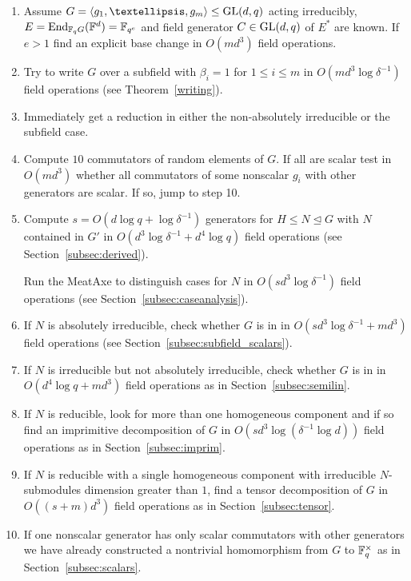 \begin{enumerate}
\item Assume $G = \left< g_1, \ldots, g_m \right> \le \GL(d,q)$ acting
irreducibly, $E = \End_{\F_q G}(\F^d) = \F_{q^e}$ and
field generator $C \in \GL(d,q)$ of $E^\ast$ are known. If $e > 1$ find an explicit
base change in $O(md^3)$ field operations.
\item Try to write $G$ over a subfield with $\beta_i = 1$ for $1 \leq i \leq m$ 
in $O(md^3\log \delta^{-1})$ field operations
(see Theorem~\ref{writing}).
\item Immediately get a reduction in either the non-absolutely irreducible
or the subfield case.
\item Compute $10$ commutators of random elements of $G$. If all are scalar test in $O(md^3)$ whether all commutators of some nonscalar $g_i$ with other generators are scalar. If so, jump to step 10. 
\item Compute $s = O(d\log q + \log \delta^{-1})$ generators for 
    $H \le N \unlhd G$ with $N$ contained in $G'$ in 
    $O(d^3\log \delta^{-1} + d^4 \log q)$ field operations
    (see Section~\ref{subsec:derived}). 

Run the MeatAxe to distinguish cases for $N$ in 
$O(sd^3 \log \delta^{-1})$ field operations
(see Section~\ref{subsec:caseanalysis}).
\item If $N$ is absolutely irreducible, check whether $G$ is in 
in $O(sd^3\log \delta^{-1} + md^3)$ field operations
(see Section~\ref{subsec:subfield_scalars}).
\item If $N$ is irreducible but not absolutely irreducible, check
whether $G$ is in  in $O(d^4\log q +m d^3)$ field operations
    as in Section~\ref{subsec:semilin}.
\item If $N$ is reducible, look for more than one 
homogeneous component and if so find an imprimitive 
decomposition of $G$ in $O(sd^3\log( \delta^{-1} \log d))$ field operations as in
Section~\ref{subsec:imprim}.
\item If $N$ is reducible with a single 
homogeneous component with irreducible $N$-submodules 
dimension greater than $1$, find a tensor
decomposition of $G$ in $O((s+m)d^3)$ field operations as in 
Section~\ref{subsec:tensor}.
\item If one nonscalar 
generator has only scalar commutators with other generators we have 
already constructed
a nontrivial homomorphism from $G$ to $\mathbb{F}_q^\times$
 as in
Section~\ref{subsec:scalars}.
\end{enumerate}

